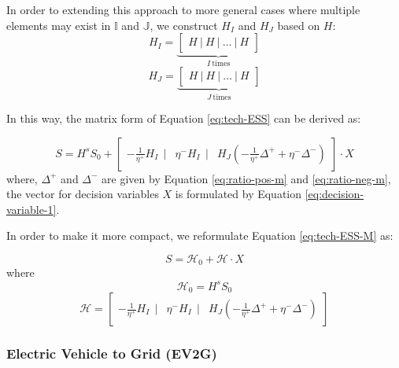 In order to extending this approach to more general cases where multiple elements may exist in $\mathbb{I}$ and  $\mathbb{J}$, we construct $H_I$ and $H_J$ based on $H$:
\begin{equation*}
H_{I} = \underbrace{\begin{bmatrix}
	H~|~H~|~ \dots~|~H
	\end{bmatrix}}_{I~\text{times}}
\end{equation*}
\begin{equation*}
H_{J} = \underbrace{\begin{bmatrix}
	H~|~H~|~ \dots~|~H
	\end{bmatrix}}_{J~\text{times}}
\end{equation*}


In this way, the matrix form of Equation \eqref{eq:tech-ESS} can be derived as:

\begin{equation}
\label{eq:tech-ESS-M}
S = H^s S_0 + \begin{bmatrix}
-\frac{1}{\eta^+} H_I~~|& \eta^- H_I~~|& H_J \left(-\frac{1}{\eta^+} \Delta^{+} + \eta^- \Delta^{-}\right)
\end{bmatrix} \cdot X
\end{equation}
where, $\Delta^{+}$ and $\Delta^{-}$ are given by Equation \eqref{eq:ratio-pos-m} and \eqref{eq:ratio-neg-m}, the vector for decision variables $X$ is formulated by Equation \eqref{eq:decision-variable-1}.


In order to make it more compact, we reformulate Equation \eqref{eq:tech-ESS-M} as:

\begin{equation}
\label{eq:state-ESS-M-1}
S = \mathcal{H}_0 + \mathcal{H} \cdot X
\end{equation}
where
\begin{equation}
\mathcal{H}_0 = H^s S_0 
\end{equation}
\begin{equation}
\label{eq:state-ESS-M-3}
\mathcal{H}  = \begin{bmatrix}
-\frac{1}{\eta^+} H_I~~|& \eta^- H_I~~|& H_J (-\frac{1}{\eta^+} \Delta^{+} + \eta^- \Delta^{-})
\end{bmatrix}
\end{equation}

\subsubsection{Electric Vehicle to Grid (EV2G)}

